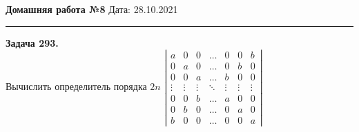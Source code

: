 \documentclass[a4paper, 12pt]{article}
\newenvironment{problem}[2][Задача]
{ \begin{mdframed}[backgroundcolor=gray!10] \textbf{#1 #2.} \\}
	{  \end{mdframed}}
\begin{document}
\noindent
\large\textbf{Домашняя работа №8} \hfill  Дата: 28.10.2021  \\
\noindent\rule{7in}{2pt}

\begin{problem}{293}
Вычислить определитель порядка $2n$
$\left| \begin{array}{rrrrrrr}a & 0 & 0 & \ldots & 0 & 0 & b\\ 0 & a & 0 & \ldots & 0 & b & 0 \\ 0 & 0 & a & \ldots & b & 0 & 0 \\ \vdots & \vdots & \vdots & \ddots & \vdots & \vdots & \vdots \\ 0 & 0 & b & \ldots & a & 0 & 0 \\ 0 & b & 0 & \ldots & 0 & a & 0 \\ b & 0 & 0 & \ldots & 0 & 0 & a \end{array} \right|$\\

\end{problem}
\end{document}
